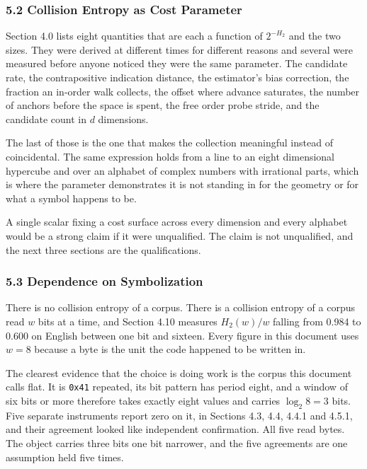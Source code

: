 \subsubsection{5.2 Collision Entropy as Cost Parameter}

Section 4.0 lists eight quantities that are each a function of \(2^{-H_2}\) and the two sizes. They were derived at different times for different reasons and several were measured before anyone noticed they were the same parameter. The candidate rate, the contrapositive indication distance, the estimator's bias correction, the fraction an in-order walk collects, the offset where advance saturates, the number of anchors before the space is spent, the free order probe stride, and the candidate count in \(d\) dimensions.

The last of those is the one that makes the collection meaningful instead of coincidental. The same expression holds from a line to an eight dimensional hypercube and over an alphabet of complex numbers with irrational parts, which is where the parameter demonstrates it is not standing in for the geometry or for what a symbol happens to be.

A single scalar fixing a cost surface across every dimension and every alphabet would be a strong claim if it were unqualified. The claim is not unqualified, and the next three sections are the qualifications.

\subsubsection{5.3 Dependence on Symbolization}

There is no collision entropy of a corpus. There is a collision entropy of a corpus read \(w\) bits at a time, and Section 4.10 measures \(H_2(w)/w\) falling from 0.984 to 0.600 on English between one bit and sixteen. Every figure in this document uses \(w = 8\) because a byte is the unit the code happened to be written in.

The clearest evidence that the choice is doing work is the corpus this document calls flat. It is \texttt{0x41} repeated, its bit pattern has period eight, and a window of six bits or more therefore takes exactly eight values and carries \(\log_2 8 = 3\) bits. Five separate instruments report zero on it, in Sections 4.3, 4.4, 4.4.1 and 4.5.1, and their agreement looked like independent confirmation. All five read bytes. The object carries three bits one bit narrower, and the five agreements are one assumption held five times.

